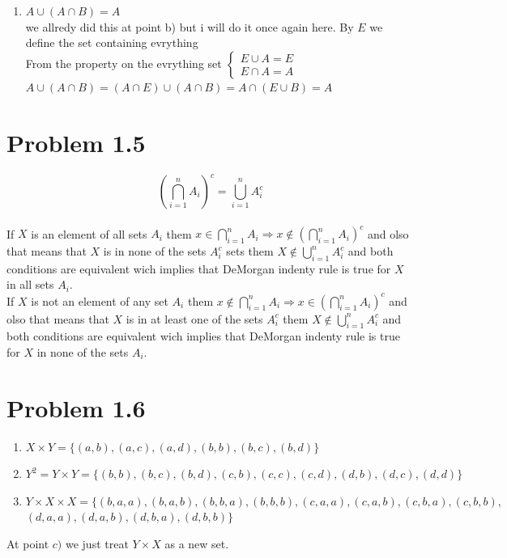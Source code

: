 \documentclass[12pt]{article}
\begin{document}
\begin{enumerate}[label=\alph*)]
\item $A \cup (A \cap B) = A$\\
we allredy did this at point b) but i will do it once again here. 
By $E$ we define the set containing evrything\\
From the property on the evrything set $
\begin{cases}
  E \cup A = E \\
  E \cap A = A
\end{cases}$
\\
$A \cup (A \cap B) = (A \cap E) \cup (A \cap B) = A \cap (E \cup B) = A$

\end{enumerate}

\section*{Problem 1.5}
\[\left(\bigcap_{i=1}^n A_i\right)^c=\bigcup_{i=1}^n A_i^c\]\\
If $X$ is an element of all sets $A_i$ them $x \in  \bigcap_{i=1}^n A_i \Rightarrow x \not\in \left(\bigcap_{i=1}^n A_i\right)^c$ and olso that means that $X$ is in none of the sets $A_i^c$ sets them $X \not\in \bigcup_{i=1}^n A_i^c$ and both conditions are equivalent wich implies that DeMorgan indenty rule is true for $X$ in all sets 
$A_i$.\\
If $X$ is not an element of any set $A_i$ them $x \not\in  \bigcap_{i=1}^n A_i \Rightarrow x \in \left(\bigcap_{i=1}^n A_i\right)^c$ and olso that means that $X$ is in at least one of the sets $A_i^c$ them $X \not\in \bigcup_{i=1}^n A_i^c$ and both conditions are equivalent wich implies that DeMorgan indenty rule is true for $X$ in none of the sets 
$A_i$.

\newpage
\section*{Problem 1.6}
\begin{enumerate}[label=\alph*)]
    \item $X \times Y = \{(a, b), (a, c), (a, d), (b, b), (b, c), (b, d)\}$
    \item $Y^2 = Y \times Y = \{(b, b), (b, c), (b, d), (c, b), (c, c), (c, d), (d, b), (d, c), (d, d)\}$
    \item $Y \times X \times X = \{(b, a, a), (b, a, b), (b, b, a), (b, b, b), (c, a, a), (c, a, b), (c, b, a), (c, b, b),$\\$ (d, a, a), (d, a, b), (d, b, a), (d, b, b)\}$
\end{enumerate}
At  point $c)$ we just treat $Y \times X$ as a new set.
\end{document}
